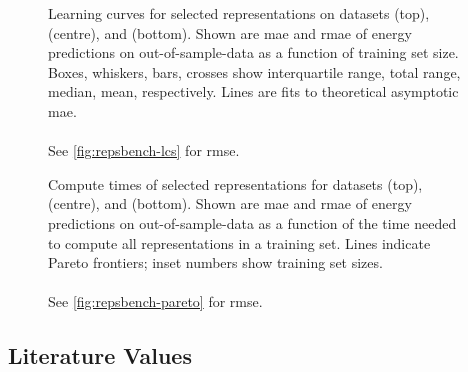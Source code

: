 \clearpage
\begin{figure}
  \centering



  \caption{Learning curves for selected representations on datasets \dsgdb{} (top), \dsba{} (centre), and \dstcor{} (bottom).
		Shown are \gls{mae} and \gls{rmae} of energy predictions on out-of-sample-data as a function of training set size.
		Boxes, whiskers, bars, crosses show interquartile range, total range, median, mean, respectively.
		Lines are fits to theoretical asymptotic \gls{mae}.
		\\\\
		See \cref{fig:repsbench-lcs} for \gls{rmse}.
	}
	\label{fig:si-repsbench_lcs_mae}
\end{figure}

\begin{figure}
  \centering



  \caption{Compute times of selected representations for datasets \dsgdb{} (top), \dsba{} (centre), and \dstcor{} (bottom).
  Shown are \gls{mae} and \gls{rmae} of energy predictions on out-of-sample-data as a function of the time needed to compute all representations in a training set.
  Lines indicate Pareto frontiers; inset numbers show training set sizes.
  \\\\
  See \cref{fig:repsbench-pareto} for \gls{rmse}.
	}
	\label{fig:si-repsbench_pareto_mae}
\end{figure}

\clearpage
\subsection{Literature Values}

